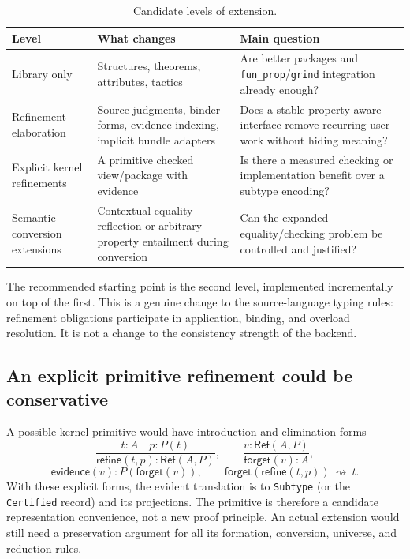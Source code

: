 \documentclass[11pt,letterpaper]{article}
\newcommand{\code}[1]{\nolinkurl{#1}}
\theoremstyle{definition}
\theoremstyle{remark}
\begin{document}
\begin{table}[htbp]
\centering\small
\caption{Candidate levels of extension.}
\label{tab:levels}
\begin{tabularx}{\linewidth}{@{}P{.23\linewidth}Y Y@{}}
\toprule Level & What changes & Main question\\\midrule
Library only & Structures, theorems, attributes, tactics & Are better packages and
\code{fun_prop}/\code{grind} integration already enough?\\
Refinement elaboration & Source judgments, binder forms, evidence indexing,
implicit bundle adapters & Does a stable property-aware interface remove
recurring user work without hiding meaning?\\
Explicit kernel refinements & A primitive checked view/package with evidence & Is
there a measured checking or implementation benefit over a subtype encoding?\\
Semantic conversion extensions & Contextual equality reflection or arbitrary
property entailment during conversion & Can the expanded equality/checking
problem be controlled and justified?\\\bottomrule
\end{tabularx}
\end{table}

The recommended starting point is the second level, implemented incrementally
on top of the first. This is a genuine change to the source-language typing
rules: refinement obligations participate in application, binding, and overload
resolution. It is not a change to the consistency strength of the backend.

\subsection{An explicit primitive refinement could be conservative}
A possible kernel primitive would have introduction and elimination forms
\[
\frac{t:A\quad p:P(t)}{\mathsf{refine}(t,p):\mathsf{Ref}(A,P)},
\qquad
\frac{v:\mathsf{Ref}(A,P)}{\mathsf{forget}(v):A},
\]
\[
\mathsf{evidence}(v):P(\mathsf{forget}(v)),\qquad
\mathsf{forget}(\mathsf{refine}(t,p))\ \rightsquigarrow\ t.
\tag{22}
\]
With these explicit forms, the evident translation is to \code{Subtype} (or the
\code{Certified} record) and its projections. The primitive is therefore a
candidate representation convenience, not a new proof principle. An actual
extension would still need a preservation argument for all its formation,
conversion, universe, and reduction rules.
\end{document}
